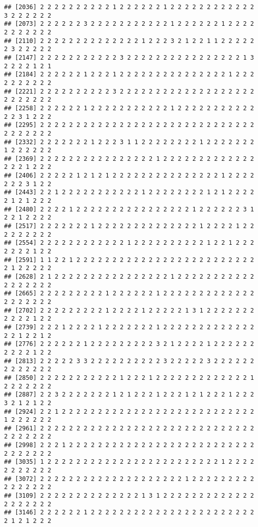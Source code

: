 \documentclass[
]{article}
\begin{document}
\begin{verbatim}
## [2036] 2 2 2 2 2 2 2 2 2 2 1 2 2 2 2 2 2 1 2 2 2 2 2 2 2 2 2 2 2 2 3 2 2 2 2 2 2
## [2073] 2 2 2 2 2 2 3 2 2 2 2 2 2 2 2 2 2 2 1 2 2 2 2 2 2 1 2 2 2 2 2 2 2 2 2 2 2
## [2110] 2 2 2 2 2 2 2 2 2 2 2 2 2 2 1 2 2 2 3 2 1 2 2 1 1 2 2 2 2 2 2 3 2 2 2 2 2
## [2147] 2 2 2 2 2 2 2 2 2 2 2 3 2 2 2 2 2 2 2 2 2 2 2 2 2 2 2 2 1 3 2 2 2 2 1 2 1
## [2184] 2 2 2 2 2 2 1 2 2 2 1 2 2 2 2 2 2 2 2 2 2 2 2 2 2 2 1 2 2 2 2 2 2 2 2 2 2
## [2221] 2 2 2 2 2 2 2 2 2 2 3 2 2 2 2 2 2 2 2 2 2 2 2 2 2 2 2 2 2 2 2 2 2 2 2 2 2
## [2258] 2 2 2 2 2 2 1 2 2 2 2 2 2 2 2 2 2 2 1 2 2 2 2 2 2 2 2 2 2 2 2 2 3 1 2 2 2
## [2295] 2 2 2 2 2 2 2 2 2 2 2 2 2 2 2 2 2 2 2 2 2 2 2 2 2 2 2 2 2 2 2 2 2 2 2 2 2
## [2332] 2 2 2 2 2 2 2 1 2 2 2 3 1 1 2 2 2 2 2 2 2 2 1 2 2 2 2 2 2 2 1 2 2 2 2 2 2
## [2369] 2 2 2 2 2 2 2 2 2 2 2 2 2 2 2 2 1 2 2 2 2 2 2 2 2 2 2 2 2 2 2 2 2 1 2 2 2
## [2406] 2 2 2 2 2 1 2 1 2 1 2 2 2 2 2 2 2 2 2 2 2 2 2 2 2 1 2 2 2 2 2 2 2 3 1 2 2
## [2443] 2 2 1 2 2 2 2 2 2 2 2 2 2 2 1 2 2 2 2 2 2 2 2 1 2 1 2 2 2 2 2 1 2 1 2 2 2
## [2480] 2 2 2 2 1 2 2 2 2 2 2 2 2 2 2 2 2 2 2 2 2 1 2 2 2 2 2 2 3 1 2 2 1 2 2 2 2
## [2517] 2 2 2 2 2 2 2 1 2 2 2 2 2 2 2 2 2 2 2 2 2 2 1 2 2 2 2 1 2 2 2 2 2 2 2 2 2
## [2554] 2 2 2 2 2 2 2 2 2 2 2 2 1 2 2 2 2 2 2 2 2 2 2 1 2 2 1 2 2 2 2 2 2 2 1 2 2
## [2591] 1 1 2 2 1 2 2 2 2 2 2 2 2 2 2 2 2 2 2 2 2 2 2 2 2 2 2 2 2 2 2 1 2 2 2 2 2
## [2628] 2 1 2 2 2 2 2 2 2 2 2 2 2 2 2 2 2 2 1 2 2 2 2 2 2 2 2 2 2 2 2 2 2 2 2 2 2
## [2665] 2 2 2 2 2 2 2 2 2 1 2 2 2 2 2 2 1 2 2 2 2 2 2 2 2 2 2 2 2 2 2 2 2 2 2 2 2
## [2702] 2 2 2 2 2 2 2 2 2 1 2 2 2 2 1 2 2 2 2 2 1 3 1 2 2 2 2 2 2 2 2 2 2 2 1 2 2
## [2739] 2 2 2 1 2 2 2 2 1 2 2 2 2 2 2 2 1 2 2 2 2 2 2 2 2 2 2 2 2 2 2 2 1 2 2 1 2
## [2776] 2 2 2 2 2 2 1 2 2 2 2 2 2 2 2 2 3 2 1 2 2 2 2 1 2 2 2 2 2 2 2 2 2 2 1 2 2
## [2813] 2 2 2 2 2 3 3 2 2 2 2 2 2 2 2 2 2 3 2 2 2 2 2 3 2 2 2 2 2 2 2 2 2 2 2 2 2
## [2850] 2 2 2 2 2 2 2 2 2 2 2 1 2 2 2 1 2 2 2 2 2 2 2 2 2 2 2 2 2 1 2 2 2 2 2 2 2
## [2887] 2 2 3 2 2 2 2 2 2 2 1 2 1 2 2 2 1 2 2 2 1 2 1 2 2 2 1 2 2 2 3 2 1 2 1 2 2
## [2924] 2 2 1 2 2 2 2 2 2 2 2 2 2 2 2 2 2 2 2 2 2 2 2 2 2 2 2 2 2 2 1 2 2 2 2 2 2
## [2961] 2 2 2 2 2 2 2 2 2 2 2 2 2 2 2 2 2 2 2 2 2 2 2 2 2 2 2 2 2 2 2 2 2 2 2 2 2
## [2998] 2 2 2 1 2 2 2 2 2 2 2 2 2 2 2 2 2 2 2 2 2 2 2 2 2 2 2 2 2 2 2 2 2 2 2 2 2
## [3035] 1 2 2 2 2 2 2 2 2 2 2 2 2 2 2 2 2 2 2 2 2 2 2 2 2 1 2 2 2 2 2 2 2 2 2 2 2
## [3072] 2 2 2 2 2 2 2 2 2 2 2 2 2 2 2 2 2 2 2 2 1 2 2 2 2 2 2 2 2 2 2 2 2 2 2 2 2
## [3109] 2 2 2 2 2 2 2 2 2 2 2 2 2 2 1 3 1 2 2 2 2 2 2 2 2 2 2 2 2 2 2 2 2 2 2 2 2
## [3146] 2 2 2 2 2 2 1 2 2 2 2 2 2 2 2 2 2 2 2 2 2 2 2 2 2 2 2 2 2 2 2 1 2 1 2 2 2

\end{verbatim}
\end{document}
